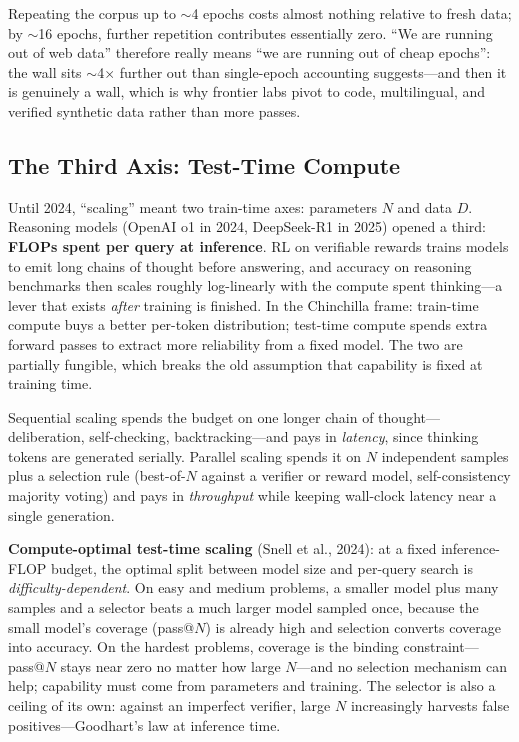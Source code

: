 \begin{keyinsight}
Repeating the corpus up to $\sim$4 epochs costs almost nothing relative to fresh data; by $\sim$16 epochs, further repetition contributes essentially zero. ``We are running out of web data'' therefore really means ``we are running out of cheap epochs'': the wall sits $\sim$4$\times$ further out than single-epoch accounting suggests---and then it is genuinely a wall, which is why frontier labs pivot to code, multilingual, and verified synthetic data rather than more passes.
\end{keyinsight}

\subsection{The Third Axis: Test-Time Compute}
\label{sec:third_axis}

Until 2024, ``scaling'' meant two train-time axes: parameters $N$ and data $D$. Reasoning models (OpenAI o1 in 2024, DeepSeek-R1 in 2025) opened a third: \textbf{FLOPs spent per query at inference}. RL on verifiable rewards trains models to emit long chains of thought before answering, and accuracy on reasoning benchmarks then scales roughly log-linearly with the compute spent thinking---a lever that exists \textit{after} training is finished. In the Chinchilla frame: train-time compute buys a better per-token distribution; test-time compute spends extra forward passes to extract more reliability from a fixed model. The two are partially fungible, which breaks the old assumption that capability is fixed at training time.

Sequential scaling spends the budget on one longer chain of thought---deliberation, self-checking, backtracking---and pays in \textit{latency}, since thinking tokens are generated serially. Parallel scaling spends it on $N$ independent samples plus a selection rule (best-of-$N$ against a verifier or reward model, self-consistency majority voting) and pays in \textit{throughput} while keeping wall-clock latency near a single generation.

\textbf{Compute-optimal test-time scaling} (Snell et al., 2024): at a fixed inference-FLOP budget, the optimal split between model size and per-query search is \textit{difficulty-dependent}. On easy and medium problems, a smaller model plus many samples and a selector beats a much larger model sampled once, because the small model's coverage (pass@$N$) is already high and selection converts coverage into accuracy. On the hardest problems, coverage is the binding constraint---pass@$N$ stays near zero no matter how large $N$---and no selection mechanism can help; capability must come from parameters and training. The selector is also a ceiling of its own: against an imperfect verifier, large $N$ increasingly harvests false positives---Goodhart's law at inference time.

